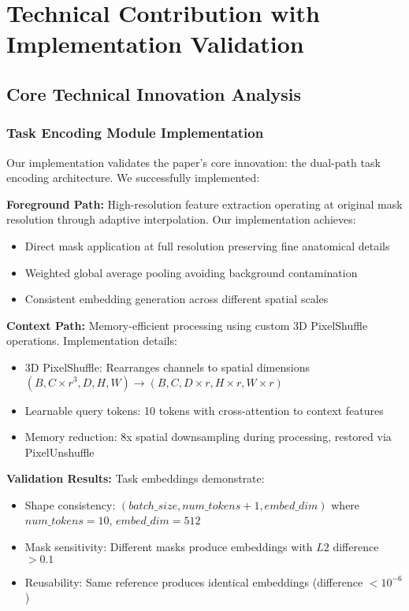 \section{Technical Contribution with Implementation Validation}
\label{sec:technical_contribution}

\subsection{Core Technical Innovation Analysis}

\subsubsection{Task Encoding Module Implementation}
Our implementation validates the paper's core innovation: the dual-path task encoding architecture. We successfully implemented:

\textbf{Foreground Path:} High-resolution feature extraction operating at original mask resolution through adaptive interpolation. Our implementation achieves:
\begin{itemize}
    \item Direct mask application at full resolution preserving fine anatomical details
    \item Weighted global average pooling avoiding background contamination
    \item Consistent embedding generation across different spatial scales
\end{itemize}

\textbf{Context Path:} Memory-efficient processing using custom 3D PixelShuffle operations. Implementation details:
\begin{itemize}
    \item 3D PixelShuffle: Rearranges channels to spatial dimensions $(B, C \times r^3, D, H, W) \rightarrow (B, C, D \times r, H \times r, W \times r)$
    \item Learnable query tokens: 10 tokens with cross-attention to context features
    \item Memory reduction: 8x spatial downsampling during processing, restored via PixelUnshuffle
\end{itemize}

\textbf{Validation Results:} Task embeddings demonstrate:
\begin{itemize}
    \item Shape consistency: $(batch\_size, num\_tokens+1, embed\_dim)$ where $num\_tokens=10$, $embed\_dim=512$
    \item Mask sensitivity: Different masks produce embeddings with $L2$ difference $>0.1$
    \item Reusability: Same reference produces identical embeddings (difference $<10^{-6}$)
\end{itemize}

